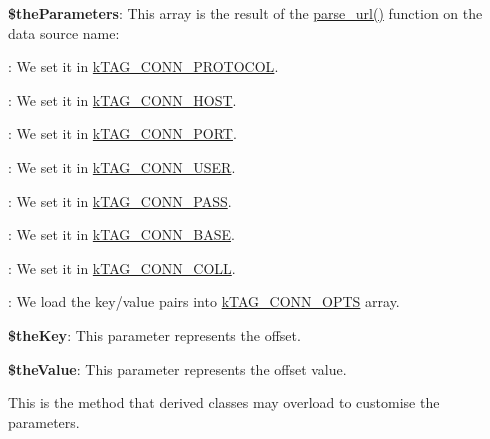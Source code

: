 \begin{DoxyItemize}
\item {\bfseries \$the\-Parameters}\-: This array is the result of the \hyperlink{}{parse\-\_\-url()} function on the data source name\-: 
\begin{DoxyItemize}
\item {}\-: We set it in \hyperlink{}{k\-T\-A\-G\-\_\-\-C\-O\-N\-N\-\_\-\-P\-R\-O\-T\-O\-C\-O\-L}. 
\item {}\-: We set it in \hyperlink{}{k\-T\-A\-G\-\_\-\-C\-O\-N\-N\-\_\-\-H\-O\-S\-T}. 
\item {}\-: We set it in \hyperlink{}{k\-T\-A\-G\-\_\-\-C\-O\-N\-N\-\_\-\-P\-O\-R\-T}. 
\item {}\-: We set it in \hyperlink{}{k\-T\-A\-G\-\_\-\-C\-O\-N\-N\-\_\-\-U\-S\-E\-R}. 
\item {}\-: We set it in \hyperlink{}{k\-T\-A\-G\-\_\-\-C\-O\-N\-N\-\_\-\-P\-A\-S\-S}. 
\item {}\-: We set it in \hyperlink{}{k\-T\-A\-G\-\_\-\-C\-O\-N\-N\-\_\-\-B\-A\-S\-E}. 
\item {}\-: We set it in \hyperlink{}{k\-T\-A\-G\-\_\-\-C\-O\-N\-N\-\_\-\-C\-O\-L\-L}. 
\item {}\-: We load the key/value pairs into \hyperlink{}{k\-T\-A\-G\-\_\-\-C\-O\-N\-N\-\_\-\-O\-P\-T\-S} array. 
\end{DoxyItemize}
\item {\bfseries \$the\-Key}\-: This parameter represents the offset. 
\item {\bfseries \$the\-Value}\-: This parameter represents the offset value. 
\end{DoxyItemize}

This is the method that derived classes may overload to customise the parameters.


